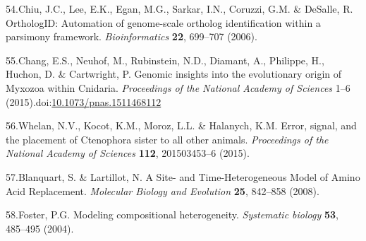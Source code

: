 \documentclass[]{article}
\begin{document}
\leavevmode\hypertarget{ref-chiu2006orthologid}{}%
54.Chiu, J.C., Lee, E.K., Egan, M.G., Sarkar, I.N., Coruzzi, G.M. \&
DeSalle, R. OrthologID: Automation of genome-scale ortholog
identification within a parsimony framework. \emph{Bioinformatics}
\textbf{22}, 699--707 (2006).

\leavevmode\hypertarget{ref-Chang:2015hl}{}%
55.Chang, E.S., Neuhof, M., Rubinstein, N.D., Diamant, A., Philippe, H.,
Huchon, D. \& Cartwright, P. Genomic insights into the evolutionary
origin of Myxozoa within Cnidaria. \emph{Proceedings of the National
Academy of Sciences} 1--6
(2015).doi:\href{https://doi.org/10.1073/pnas.1511468112}{10.1073/pnas.1511468112}

\leavevmode\hypertarget{ref-Whelan:2015jj}{}%
56.Whelan, N.V., Kocot, K.M., Moroz, L.L. \& Halanych, K.M. Error,
signal, and the placement of Ctenophora sister to all other animals.
\emph{Proceedings of the National Academy of Sciences} \textbf{112},
201503453--6 (2015).

\leavevmode\hypertarget{ref-Blanquart:2008gl}{}%
57.Blanquart, S. \& Lartillot, N. A Site- and Time-Heterogeneous Model
of Amino Acid Replacement. \emph{Molecular Biology and Evolution}
\textbf{25}, 842--858 (2008).

\leavevmode\hypertarget{ref-Foster:2004tw}{}%
58.Foster, P.G. Modeling compositional heterogeneity. \emph{Systematic
biology} \textbf{53}, 485--495 (2004).
\end{document}
